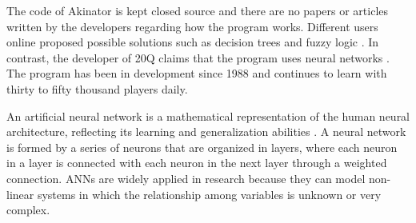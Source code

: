 The code of Akinator is kept closed source and there are no papers or articles written by the developers regarding how the program works.
Different users online proposed possible solutions such as decision trees \cite{allain:2013} and fuzzy logic \cite{chan:2014}.
In contrast, the developer of 20Q claims that the program uses neural networks  \cite{schrock:2006}.
The program has been in development since 1988 and continues to learn with thirty to fifty thousand players daily.

An artificial neural network is a mathematical representation of the human neural architecture, reflecting its learning and generalization abilities \cite{amato:2013}.
A neural network is formed by a series of neurons that are organized in layers, where each neuron in a layer is connected with each neuron in the next layer through a weighted connection.
ANNs are widely applied in research because they can model non-linear systems in which the relationship among variables is unknown or very complex.
